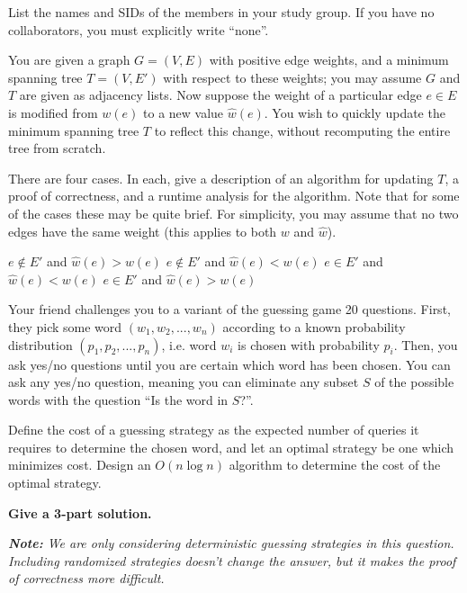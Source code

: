 \documentclass{article}
\begin{document}
List the names and SIDs of the members in your study group.
If you have no collaborators, you must explicitly write “none”.


You are given a graph $G = (V, E)$ with positive edge weights, and a minimum spanning tree $T = (V, E')$ with respect to these weights; you may assume $G$ and $T$ are given as adjacency lists. Now suppose the weight of a particular edge $e \in E$ is modified from $w(e)$ to a new value $\hat{w}(e)$. You wish to quickly update the minimum spanning tree $T$ to reflect this change, without recomputing the entire tree from scratch. 

There are four cases. In each, give a description of an algorithm for updating $T$, a proof of correctness, and a runtime analysis for the algorithm. Note that for some of the cases these may be quite brief. For simplicity, you may assume that no two edges have the same weight (this applies to both $w$ and $\hat{w}$).

\begin{subparts}
\subpart $e \notin E'$ and $\hat{w}(e) > w(e)$
\subpart $e \notin E'$ and $\hat{w}(e) < w(e)$
\subpart $e \in E'$ and $\hat{w}(e) < w(e)$
\subpart $e \in E'$ and $\hat{w}(e) > w(e)$
\end{subparts}

Your friend challenges you to a variant of the guessing game 20
questions. First, they pick some word $(w_1, w_2, ..., w_n)$ according
to a known probability distribution $(p_1, p_2, ..., p_n)$, i.e. word $w_i$
is chosen with probability $p_i$. Then, you ask yes/no questions until
you are certain which word has been chosen. You can ask any yes/no
question, meaning you can eliminate any subset $S$ of the possible
words with the question ``Is the word in $S$?''.

Define the cost of a guessing strategy as the expected number of
queries it requires to determine the chosen word, and let an optimal
strategy be one which minimizes cost. Design an $O(n \log n)$
algorithm to determine the cost of the optimal strategy.

\textbf{Give a 3-part solution.}

\emph{\textbf{Note:} We are only considering deterministic guessing
strategies in this question. Including randomized strategies doesn't
change the answer, but it makes the proof of correctness more
difficult.}

\end{document}
